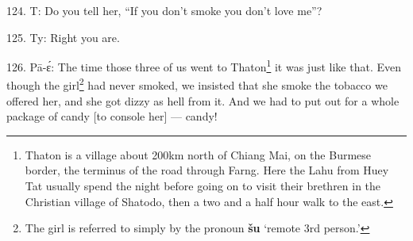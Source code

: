 124. T: Do you tell her, ``If you don't smoke you don't love me''?

125. Ty: Right you are.

126. Pā-ɛ́: The time those three of us went to Thaton\footnote{Thaton is a village about 200km north of Chiang Mai, on the Burmese border, the terminus of the road through Farng. Here the Lahu from Huey Tat usually spend the night before going on to visit their brethren in the Christian village of Shatodo, then a two and a half hour walk to the east.} it was just like that.
Even though the girl\footnote{The girl is referred to simply by the pronoun \textbf{šu} `remote 3rd person.'} had never smoked, we insisted that she smoke the tobacco
we offered her, and she got dizzy as hell from it. And we had to put out for a
whole package of candy [to console her] --- candy!

